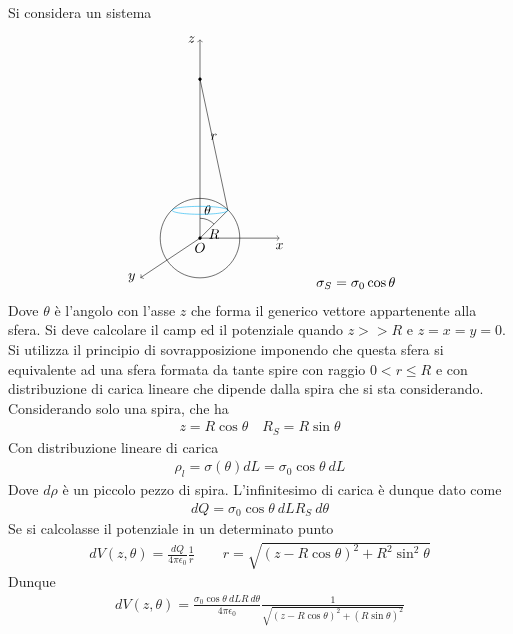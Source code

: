 \documentclass[a4paper, oneside]{article}
\begin{document}
\begin{example}[Esercizio 1 20/2/2012]
    Si considera un sistema 
    \begin{gather*}
        \begin{tikzpicture}
            \draw(0, 0) circle (1);
            \draw[->](0, 0) -- (2, 0) node[at end, below] {$x$};
            \draw[->](0, 0) -- (0, 5) node[at end, left] {$z$};
            \draw[->](0, 0) -- (-1.5, -1) node[at end, left] {$y$};
            \filldraw(0, 0) circle (1pt) node[anchor = north] {$O$};
            \draw(0, 0) -- (0.7, 0.7) node[midway, below] {$R$};
            \draw(0, 0.5) arc (90:45:0.5) node[midway, above] {$\theta$};
            \draw[cyan](0, 0.7) ellipse (0.7 and 0.1);
            \draw(0.7, 0.7) -- (0, 4) node[midway, above] {$r$};
            \filldraw(0, 4) circle (1pt);
        \end{tikzpicture} \qquad \sigma_S = \sigma_0 \cos\theta
    \end{gather*}
    Dove $\theta$ è l'angolo con l'asse $z$ che forma il generico vettore appartenente 
    alla sfera. Si deve calcolare il camp ed il potenziale quando $z >> R$ e $z = x = y = 0 $.  \\
    Si utilizza il principio di sovrapposizione imponendo che questa 
    sfera si equivalente ad una sfera formata da tante spire con raggio $0 < r \leq R$
    e con distribuzione di carica lineare che dipende dalla spira che si sta considerando.
    Considerando solo una spira, che ha 
    \begin{gather*}
        z = R\cos\theta \quad R_S = R\sin \theta
    \end{gather*}
    Con distribuzione lineare di carica
    \begin{gather*}
        \rho_l = \sigma(\theta)dL = \sigma_0\cos\theta \ dL
    \end{gather*}
    Dove $d\rho$ è un piccolo pezzo di spira. L'infinitesimo di carica è dunque dato come
    \begin{gather*}
        dQ = \sigma_0\cos\theta \ dL R_S \ d\theta
    \end{gather*}
    Se si calcolasse il potenziale in un determinato punto 
    \begin{gather*}
        dV(z, \theta) = \frac{dQ}{4\pi \epsilon_0}\frac{1}{r} \qquad r= \sqrt{ (z - R\cos\theta)^{2} + R^{2}\sin^{2}\theta}
    \end{gather*}
    Dunque 
    \begin{gather*}
        dV(z, \theta) = \frac{\sigma_0 \cos\theta \ dL R \ d\theta}{4\pi \epsilon_0} \frac{1}{\sqrt{(z - R\cos\theta)^{2} + (R\sin\theta)^{2}} }

\end{gather*}
\end{example}
\end{document}
